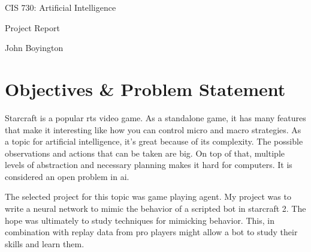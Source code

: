 \documentclass{amsart}
\theoremstyle{definition}
\begin{document}
\LARGE{CIS 730: Artificial Intelligence}
 
\large
Project Report
 
John Boyington
\newline
\bigskip









\section{Objectives \& Problem Statement}


Starcraft is a popular rts video game.
As a standalone game, it has many features that make it interesting like how you can control micro and macro strategies.
As a topic for artificial intelligence, it's great because of its complexity.
The possible observations and actions that can be taken are big.
On top of that, multiple levels of abstraction and necessary planning makes it hard for computers.
It is considered an open problem in ai.

The selected project for this topic was game playing agent.
My project was to write a neural network to mimic the behavior of a scripted bot in starcraft 2.
The hope was ultimately to study techniques for mimicking behavior.
This, in combination with replay data from pro players might allow a bot to study their skills and learn them.
\end{document}
